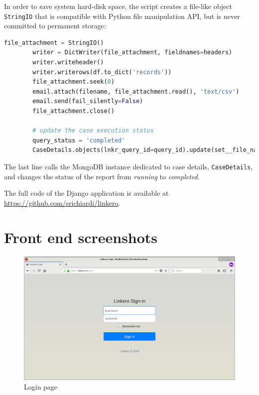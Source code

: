 In order to save system hard-disk space, the script creates a file-like object
\texttt{StringIO} that is compatible with Python file manipulation API,
but is never committed to permanent storage:
\begin{lstlisting}[language=Python, breaklines=true]
        file_attachment = StringIO()
        writer = DictWriter(file_attachment, fieldnames=headers)
        writer.writeheader()
        writer.writerows(df.to_dict('records'))
        file_attachment.seek(0)
        email.attach(filename, file_attachment.read(), 'text/csv')
        email.send(fail_silently=False)
        file_attachment.close()
        
        # update the case execution status
        query_status = 'completed'
        CaseDetails.objects(lnkr_query_id=query_id).update(set__file_name=filename)
\end{lstlisting}
The last line calls the MongoDB instance dedicated to case details,
\texttt{CaseDetails}, and changes the status of the report from \emph{running}
to \emph{completed}.

The full code of the Django application is available at
\url{https://github.com/srichiardi/linkero}.
\vfill


\section{Front end screenshots}

\begin{figure}[H]
\centering
\includegraphics[scale=0.3]{imgs/login.png}
\caption{Login page}
\label{fig:login}
\end{figure}

